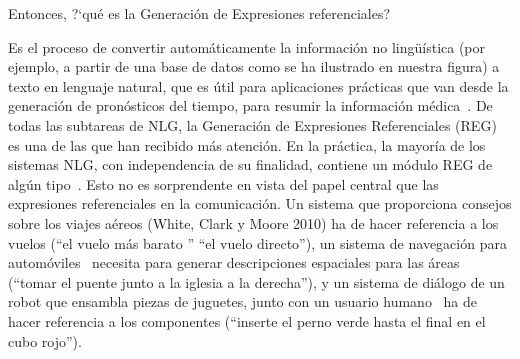 Entonces,  ?`qu\'e es la Generaci\'on de Expresiones referenciales? 

Es el proceso de convertir autom\'aticamente la informaci\'on no ling\"u\'{i}stica (por ejemplo, a partir de una base de datos como se ha ilustrado en nuestra figura) a texto en lenguaje natural, que es \'util para aplicaciones pr\'acticas que van desde la generaci\'on de pron\'osticos del tiempo, para resumir la informaci\'on m\'edica~\cite{dale2000}. De todas las subtareas de NLG, la Generaci\'on de Expresiones Referenciales (REG) es
una de las que han recibido m\'as atenci\'on. En la pr\'actica, la mayor\'ia de los
sistemas NLG, con independencia de su finalidad,
contiene un m\'odulo REG de alg\'un tipo~\cite{Mellish2004}. Esto no es sorprendente
en vista del papel central que las expresiones referenciales en la comunicaci\'on. Un sistema que proporciona
consejos sobre los viajes a\'ereos (White, Clark y Moore 2010) ha de hacer referencia a los vuelos (``el
vuelo m\'as barato '' ``el vuelo directo''), un sistema de navegaci\'on para autom\'oviles~\cite{Drager:2012:GLN:2380816.2380908}
necesita para generar descripciones espaciales para las \'areas (``tomar el puente junto a la iglesia a la derecha''),
y un sistema de di\'alogo de un robot que ensambla piezas de juguetes, junto con un usuario humano~\cite{foster-etal-ijcai2009} ha de hacer referencia a los componentes (``inserte el perno verde hasta el final en el cubo rojo'').




